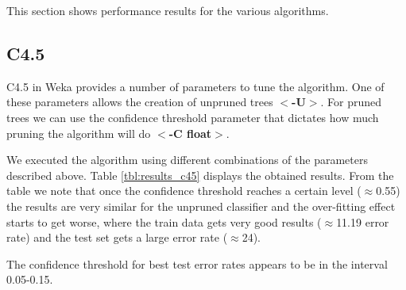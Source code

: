 \documentclass[a4paper]{llncs}
\begin{document}
This section shows performance results for the various algorithms.

\subsection{C4.5}

C4.5 in Weka provides a number of parameters to tune the algorithm.
One of these parameters allows the creation of unpruned trees $<$\textbf{-U}$>$.
For pruned trees we can use the confidence threshold parameter that dictates how
much pruning the algorithm will do $<$\textbf{-C float}$>$.

We executed the algorithm using different combinations of the parameters described above.
Table \ref{tbl:results_c45} displays the obtained results. From the table
we note that once the confidence threshold reaches a certain level ($\approx$0.55) the results
are very similar for the unpruned classifier and the over-fitting effect starts to get worse,
where the train data gets very good results ($\approx$11.19 error rate) and the test set gets a
large error rate ($\approx$24).

The confidence threshold for best test error rates appears to be in the interval 0.05-0.15.   
\end{document}
